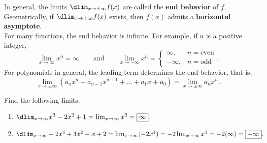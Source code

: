 \documentclass{book}
\begin{document}
%
%

In general, the limits $\dlim_{x\to \pm \infty} f(x)$ are called the \textbf{end behavior} of $f$. Geometrically, if $\dlim_{x\to \pm\infty} f(x)$ exists, then $f(x)$ admits a \textbf{horizontal asymptote}.\\ %

For many functions, the end behavior is infinite. For example, if $n$ is a positive integer, \[\lim_{x\to \infty} x^n = \infty\qquad\text{and}\qquad \lim_{x\to -\infty} x^n = \begin{cases} \infty, & n=\text{even}\\ -\infty, & n=\text{odd}\end{cases}.\]\vs  For polynomials in general, the leading term determines the end behavior, that is, 
\[\lim_{x\to \pm\infty} (a_nx^n + a_{n-1}x^{n-1} + \ldots + a_1x + a_0) = \lim_{x\to \pm\infty} a_nx^n.\]

\begin{Exam} Find the following limits.
\begin{enumerate}
\item $\dlim_{x\to \infty} x^3-2x^2+1 = \lim_{x\to \infty} x^3 = \fbox{$\infty$}$.\\

\item $\dlim_{x\to \infty} -2x^4+3x^2-x+2 = \lim_{x\to \infty} (-2x^4) = -2\lim_{x\to \infty} x^4 = -2(\infty) =  \fbox{$-\infty$}. $
\end{enumerate}
\end{Exam}\vs
\end{document}
